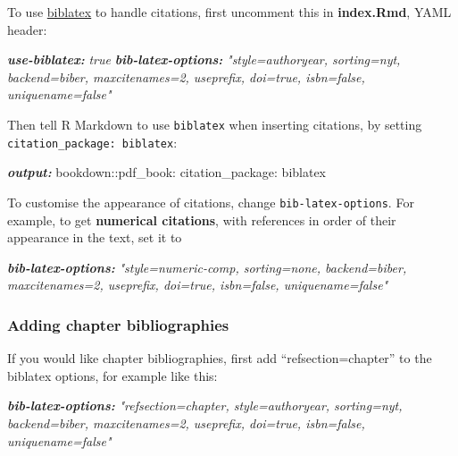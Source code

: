 \documentclass[a4paper, nobind]{templates/ociamthesis}
\newenvironment{Shaded}{\begin{snugshade}}{\end{snugshade}}
\newcommand{\AnnotationTok}[1]{\textcolor[rgb]{0.56,0.35,0.01}{\textbf{\textit{#1}}}}
\newcommand{\CommentTok}[1]{\textcolor[rgb]{0.56,0.35,0.01}{\textit{#1}}}
\newcommand{\NormalTok}[1]{#1}
\renewenvironment{Shaded}
{
  \vspace{10pt}%
  \begin{snugshade}%
}{%
  \end{snugshade}%
  \vspace{8pt}%
}
\begin{document}
To use \href{https://www.overleaf.com/learn/latex/Bibliography_management_with_biblatex}{biblatex} to handle citations, first uncomment this in \textbf{index.Rmd}, YAML header:

\begin{Shaded}
\begin{Highlighting}[]
\AnnotationTok{use{-}biblatex:}\CommentTok{ true}
\AnnotationTok{bib{-}latex{-}options:}\CommentTok{ "style=authoryear, sorting=nyt, backend=biber, maxcitenames=2, useprefix, doi=true, isbn=false, uniquename=false"}
\end{Highlighting}
\end{Shaded}

Then tell R Markdown to use \texttt{biblatex} when inserting citations, by setting \texttt{citation\_package:\ biblatex}:

\begin{Shaded}
\begin{Highlighting}[]
\AnnotationTok{output:}
\NormalTok{  bookdown::pdf\_book:}
\NormalTok{    citation\_package: biblatex}
\end{Highlighting}
\end{Shaded}

To customise the appearance of citations, change \texttt{bib-latex-options}. For example, to get \textbf{numerical citations}, with references in order of their appearance in the text, set it to

\begin{Shaded}
\begin{Highlighting}[]
\AnnotationTok{bib{-}latex{-}options:}\CommentTok{ "style=numeric{-}comp, sorting=none, backend=biber, maxcitenames=2, useprefix, doi=true, isbn=false, uniquename=false"}
\end{Highlighting}
\end{Shaded}

\hypertarget{adding-chapter-bibliographies}{%
\subsubsection{Adding chapter bibliographies}\label{adding-chapter-bibliographies}}

If you would like chapter bibliographies, first add ``refsection=chapter'' to the biblatex options, for example like this:

\begin{Shaded}
\begin{Highlighting}[]
\AnnotationTok{bib{-}latex{-}options:}\CommentTok{ "refsection=chapter, style=authoryear, sorting=nyt, backend=biber, maxcitenames=2, useprefix, doi=true, isbn=false, uniquename=false"}
\end{Highlighting}
\end{Shaded}
\end{document}
